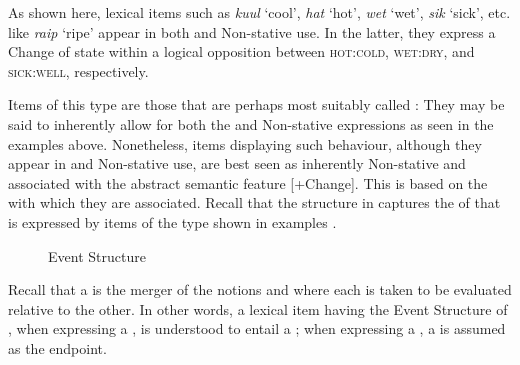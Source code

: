 
\z
\z

As shown here, lexical items such as \textit{kuul} `cool', \textit{hat} `hot', \textit{wet} `wet', \textit{sik} `sick', etc. like \textit{raip} `ripe' appear in both  and Non-stative use. In the latter, they express a Change of state within a logical opposition between \textsc{hot:cold}, \textsc{wet:dry}, and \textsc{sick:well}, respectively. 

Items of this type are those that are perhaps most suitably called : They may be said to inherently allow for both the  and Non-stative expressions as seen in the examples above. Nonetheless, items displaying such behaviour, although they appear in  and Non-stative use, are best seen as inherently Non-stative and associated with the abstract semantic feature [+Change]. This is based on the  with which they are associated. Recall that the structure in  captures the  of  that is expressed by items of the type shown in examples . 

\begin{figure}
\caption{ Event Structure \citep[56]{Pustejovsky1991}\label{ex:5:12}}
\end{figure}


Recall that a  is the merger of the notions  and  where each is taken to be evaluated relative to the other. In other words, a lexical item having the Event Structure of , when expressing a , is understood to entail a ; when expressing a , a  is assumed as the endpoint. 

